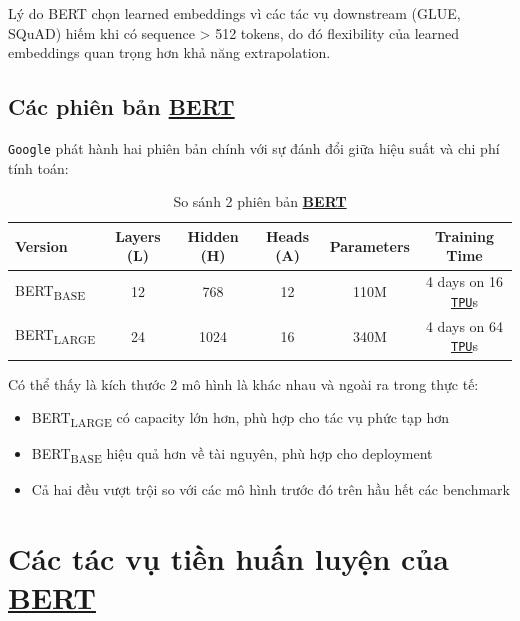 Lý do BERT chọn learned embeddings vì các tác vụ downstream (GLUE, SQuAD) hiếm khi có sequence > 512 tokens, do đó flexibility của learned embeddings quan trọng hơn khả năng extrapolation.

\subsection{Các phiên bản \hyperref[acro:bert]{\textbf{BERT}}}
\label{ssec:bert_versions}

\texttt{Google} phát hành hai phiên bản chính với sự đánh đổi giữa hiệu suất và chi phí tính toán:

\begin{table}[H]
\centering
\caption{So sánh 2 phiên bản \hyperref[acro:bert]{\textbf{BERT}}}
\label{tab:bert_versions}
\begin{tabular}{lccccc}
\toprule
\textbf{Version} & \textbf{Layers (L)} & \textbf{Hidden (H)} & \textbf{Heads (A)} & \textbf{Parameters} & \textbf{Training Time} \\
\midrule
BERT\textsubscript{BASE} & 12 & 768 & 12 & 110M & 4 days on 16 \hyperref[acro:tpu]{\texttt{TPU}}s \\
BERT\textsubscript{LARGE} & 24 & 1024 & 16 & 340M & 4 days on 64 \hyperref[acro:tpu]{\texttt{TPU}}s \\
\bottomrule
\end{tabular}
\end{table}

Có thể thấy là kích thước 2 mô hình là khác nhau và ngoài ra trong thực tế:
\begin{itemize}
    \item BERT\textsubscript{LARGE} có capacity lớn hơn, phù hợp cho tác vụ phức tạp hơn
    \item BERT\textsubscript{BASE} hiệu quả hơn về tài nguyên, phù hợp cho deployment
    \item Cả hai đều vượt trội so với các mô hình trước đó trên hầu hết các benchmark
\end{itemize}

\section{Các tác vụ tiền huấn luyện của \hyperref[acro:bert]{\textbf{BERT}}}
\label{sec:pre_training_tasks}

